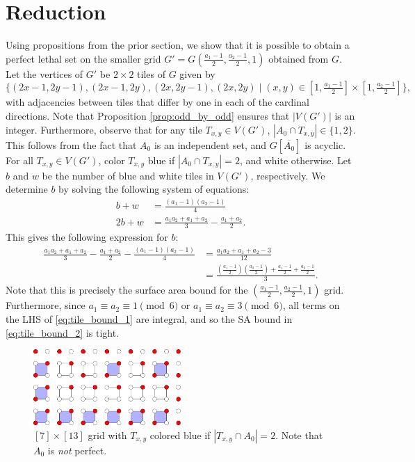 \section{Reduction}
Using propositions from the prior section, we show that it is possible to obtain a perfect lethal set on the smaller grid $G' = G(\frac{a_1-1}{2}, \frac{a_2-1}{2}, 1)$ obtained from $G$. Let the vertices of $G'$ be $2 \times 2$ tiles of $G$ given by
$$\{(2x-1,2y-1),(2x-1,2y),(2x,2y-1),(2x,2y) \mid (x,y) \in [1, \tfrac{a_1-1}{2}] \times [1, \tfrac{a_2-1}{2}]\},$$
with adjacencies between tiles that differ by one in each of the cardinal directions. Note that Proposition \ref{prop:odd_by_odd} ensures that $|V(G')|$ is an integer. Furthermore, observe that for any tile $T_{x,y} \in V(G')$, $|A_0 \cap T_{x,y}| \in \{1,2\}$. This follows from the fact that $A_0$ is an independent set, and $G[\overline{A_0}]$ is acyclic. For all $T_{x,y} \in V(G')$, color $T_{x,y}$ blue if $|A_0 \cap T_{x,y}| = 2$, and white otherwise. Let $b$ and $w$ be the number of blue and white tiles in $V(G')$, respectively. We determine $b$ by solving the following system of equations:
\begin{align*}
b + w &= \frac{(a_1-1)(a_2-1)}{4} \\
2b + w &= \frac{a_1a_2+a_1+a_2}{3} - \frac{a_1+a_2}{2}.
\end{align*}
This gives the following expression for $b$:
\begin{align}
\frac{a_1a_2+a_1+a_2}{3} - \frac{a_1+a_2}{2} - \frac{(a_1-1)(a_2-1)}{4} &= \frac{a_1a_2+a_1+a_2-3}{12} \label{eq:tile_bound_1} \\
&= \frac{(\frac{a_1-1}{2})(\frac{a_2-1}{2}) + \frac{a_1-1}{2} + \frac{a_2-1}{2}}{3} \label{eq:tile_bound_2}.
\end{align}
Note that this is precisely the surface area bound for the $(\frac{a_1-1}{2}, \frac{a_2-1}{2}, 1)$ grid. Furthermore, since $a_1 \equiv a_2 \equiv 1 \pmod 6$ or $a_1 \equiv a_2 \equiv 3 \pmod 6$, all terms on the LHS of \ref{eq:tile_bound_1} are integral, and so the SA bound in \ref{eq:tile_bound_2} is tight.

\begin{figure}[]
\centering
\includegraphics[width=0.5\textwidth]{figures/6/tiles.pdf}
\caption{$[7] \times [13]$ grid with $T_{x,y}$ colored blue if $|T_{x,y} \cap A_0| = 2$. Note that $A_0$ is \emph{not} perfect.}
\label{fig:tiles}
\end{figure} 

